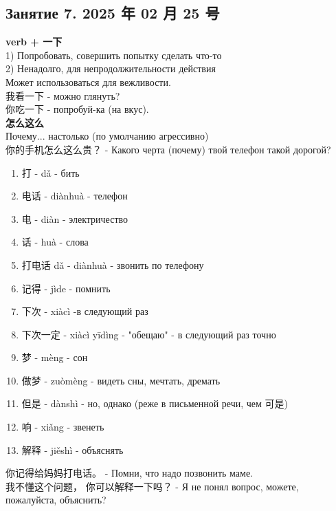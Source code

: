 \newpage
\subsection{Занятие 7. 2025 年 02 月 25 号}
\textbf{verb + 一下}\\
1) Попробовать, совершить попытку сделать что-то\\
2) Ненадолго, для непродолжительности действия\\
Может использоваться для вежливости.\\
我看一下 - можно глянуть?\\
你吃一下 - попробуй-ка (на вкус).\\

\textbf{怎么这么}\\
Почему... настолько (по умолчанию агрессивно)\\
你的手机怎么这么贵？ - Какого черта (почему) твой телефон такой дорогой?
\begin{newwords}
	\begin{enumerate}\hfill
		\item 打 - dǎ - бить
		\item 电话 - diànhuà - телефон
		\item 电 - diàn - электричество
		\item 话 - huà - слова
		\item 打电话 dǎ - diànhuà - звонить по телефону
		\item 记得 - jìde - помнить
		\item 下次 - xiàcì -в следующий раз
		\item 下次一定 - xiàcì yīdìng - "обещаю" - в следующий раз точно
		\item 梦 - mèng - сон
		\item 做梦 - zuòmèng - видеть сны, мечтать, дремать
		\item 但是 - dànshì - но, однако (реже в письменной речи, чем 可是)
		\item 响 - xiǎng - звенеть
		\item 解释 - jiěshì - объяснять
	\end{enumerate}
\end{newwords}
你记得给妈妈打电话。 - Помни, что надо позвонить маме.\\
我不懂这个问题， 你可以解释一下吗？ - Я не понял вопрос, можете, пожалуйста, объяснить?\\